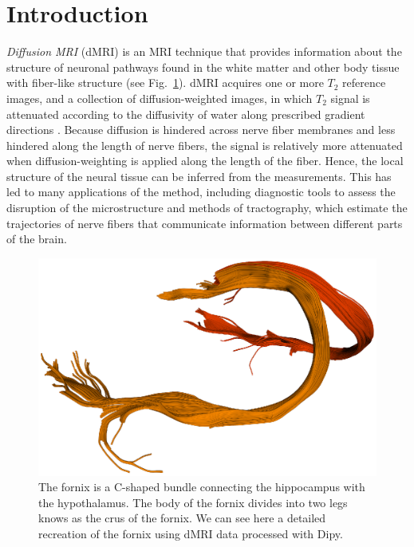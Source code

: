 \documentclass{bioinfo}
\begin{document}
\section{Introduction}

\emph{Diffusion MRI} (dMRI) \citep{merboldt-hanicke-etal:85,
  lebihan-breton:85, taylor-bushell:85}
is an MRI technique \citep{callaghan:91} that provides information
about the structure of neuronal pathways found in the white matter and
other body tissue with fiber-like structure (see Fig.~\ref{Fig:fornix}). dMRI acquires one or more
$T_{2}$ reference images, and a collection of diffusion-weighted images, in which $T_{2}$ signal is attenuated according
to the diffusivity of water along prescribed gradient directions
\citep{behrens-johansen-berg:09, jones:10}. Because diffusion is hindered
across nerve fiber membranes and less hindered along the length of nerve fibers, the
signal is relatively more attenuated when diffusion-weighting is applied along
the length of the fiber. Hence, the local structure of the neural tissue can be
inferred from the measurements. This has led to many applications of the method,
including diagnostic tools to assess the disruption of the microstructure and
methods of tractography, which estimate the trajectories of nerve fibers that
communicate information between different parts of the brain.

\begin{figure}
\includegraphics[scale=0.55]{Figures/fornix.eps}
\centering{}
\caption{The fornix is a C-shaped bundle connecting the hippocampus with the
 hypothalamus. The body of the fornix divides into two legs knows as the crus
 of the fornix. We can see here a detailed recreation of the fornix using dMRI
 data processed with Dipy. \label{Fig:fornix}}
\end{figure}
\end{document}
